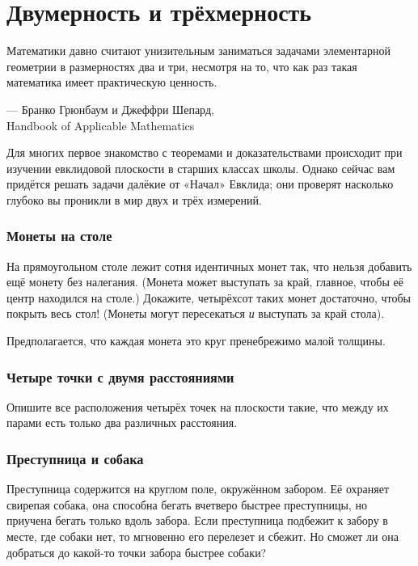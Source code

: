 \chapter{Двумерность и трёхмерность}

\setlength{\epigraphwidth}{.83\textwidth}
\epigraph{Математики давно считают унизительным заниматься задачами элементарной геометрии в размерностях два и три, несмотря на то, что как раз такая математика имеет практическую ценность.}{--- Бранко Грюнбаум и Джеффри Шепард,\\ Handbook of Applicable Mathematics}

Для многих первое знакомство с теоремами и доказательствами
происходит при изучении евклидовой плоскости
в старших классах школы.
Однако сейчас вам придётся решать задачи далёкие от «Начал» Евклида;
они проверят насколько глубоко вы проникли в мир двух и трёх измерений.

\subsection*{Монеты на столе}\label{Монеты на столе}

На прямоугольном столе лежит сотня идентичных монет так, что нельзя добавить ещё монету без налегания.
(Монета может выступать за край, главное, чтобы её центр находился на столе.)
Докажите, четырёхсот таких монет достаточно, чтобы покрыть весь стол!
(Монеты могут пересекаться \emph{и} выступать за край стола).

Предполагается, что каждая монета это круг пренебрежимо малой толщины.

\subsection*{Четыре точки с двумя расстояниями}

Опишите все расположения четырёх точек на плоскости такие, что между их парами есть только два различных расстояния.

\subsection*{Преступница и собака}

Преступница содержится на круглом  поле, окружённом забором.
Её охраняет свирепая собака, она способна бегать вчетверо быстрее преступницы, но приучена бегать только вдоль забора.
Если преступница подбежит к забору в месте, где собаки нет, то мгновенно его перелезет и сбежит.
Но сможет ли она добраться до какой-то точки забора быстрее собаки?

